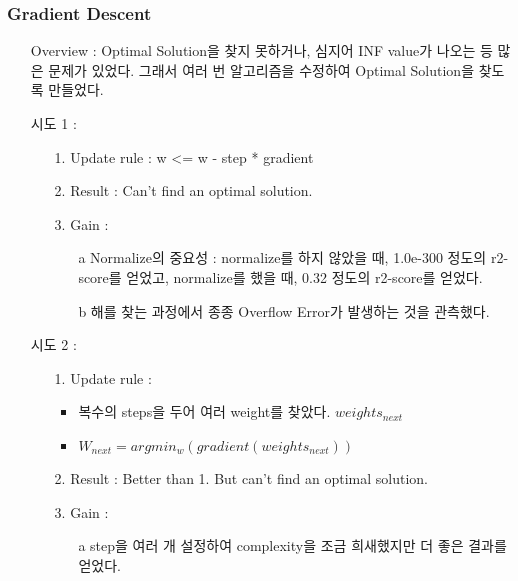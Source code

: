 \documentclass{article}
\begin{document}
\subsubsection{Gradient Descent}
    \begin{itemize}
        \item[] Overview : Optimal Solution을 찾지 못하거나, 심지어 INF value가 나오는 등 많은 문제가 있었다. 그래서 여러 번 알고리즘을 수정하여 Optimal Solution을 찾도록 만들었다.
        
        \item[] 시도 1 : 
            \begin{itemize}
                \item[1.] Update rule : w <= w - step * gradient
                \item[2.] Result : Can't find an optimal solution.
                \item[3.] Gain : 
                    \begin{itemize}
                        \item[a] Normalize의 중요성 : normalize를 하지 않았을 때, 1.0e-300 정도의 r2-score를 얻었고, normalize를 했을 때, 0.32 정도의 r2-score를 얻었다.
                        
                        \item[b] 해를 찾는 과정에서 종종 Overflow Error가 발생하는 것을 관측했다.
                    \end{itemize}
            \end{itemize}
        \item[] 시도 2 : 
            \begin{itemize}
                \item[1.] Update rule : 
                    \begin{itemize}
                        \item 복수의 steps을 두어 여러 weight를 찾았다. $weights_{next}$
                        \item $W_{next} = argmin_w{(gradient(weights_{next}))}$
                    \end{itemize}
                \item[2.] Result : Better than 1. But can't find an optimal solution.
                \item[3.] Gain : 
                    \begin{itemize}
                        \item[a] step을 여러 개 설정하여 complexity을 조금 희새했지만 더 좋은 결과를 얻었다.
                        

\end{itemize}
\end{itemize}
\end{itemize}
\end{document}
